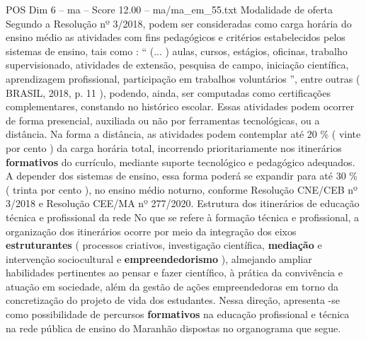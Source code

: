 \begin{textsample}{POS Dim 6 – ma – Score 12.00 – ma/ma\_em\_55.txt}
Modalidade de oferta Segundo a Resolução nº 3/2018, podem ser consideradas como carga horária do ensino médio as atividades com fins pedagógicos e critérios estabelecidos pelos sistemas de ensino, tais como : “ (... ) aulas, cursos, estágios, oficinas, trabalho supervisionado, atividades de extensão, pesquisa de campo, iniciação científica, aprendizagem profissional, participação em trabalhos voluntários ”, entre outras ( BRASIL, 2018, p. 11 ), podendo, ainda, ser computadas como certificações complementares, constando no histórico escolar.
Essas atividades podem ocorrer de forma presencial, auxiliada ou não por ferramentas tecnológicas, ou a distância.
Na forma a distância, as atividades podem contemplar até 20 \% ( vinte por cento ) da carga horária total, incorrendo prioritariamente nos itinerários \textbf{formativos} do currículo, mediante suporte tecnológico e pedagógico adequados.
A depender dos sistemas de ensino, essa forma poderá se expandir para até 30 \% ( trinta por cento ), no ensino médio noturno, conforme Resolução CNE/CEB nº 3/2018 e Resolução CEE/MA nº 277/2020.
Estrutura dos itinerários de educação técnica e profissional da rede No que se refere à formação técnica e profissional, a organização dos itinerários ocorre por meio da integração dos eixos \textbf{estruturantes} ( processos criativos, investigação científica, \textbf{mediação} e intervenção sociocultural e \textbf{empreendedorismo} ), almejando ampliar habilidades pertinentes ao pensar e fazer científico, à prática da convivência e atuação em sociedade, além da gestão de ações empreendedoras em torno da concretização do projeto de vida dos estudantes.
Nessa direção, apresenta -se como possibilidade de percursos \textbf{formativos} na educação profissional e técnica na rede pública de ensino do Maranhão dispostas no organograma que segue.

\end{textsample}
